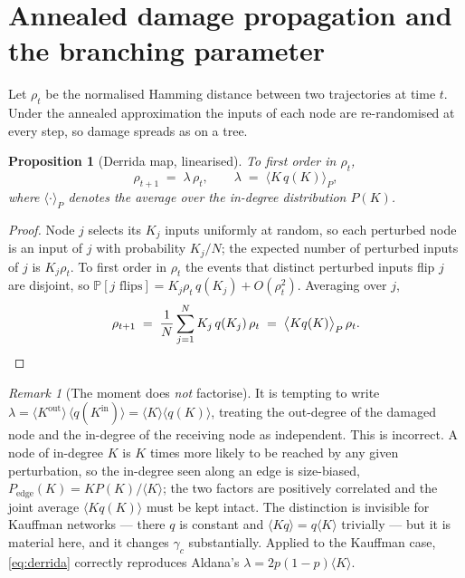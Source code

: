 \documentclass[11pt]{article}
\newtheorem{proposition}{Proposition}
\theoremstyle{remark}
\newtheorem{remark}{Remark}
\newcommand{\Prob}{\mathbb{P}}
\begin{document}
\section{Annealed damage propagation and the branching parameter}
\label{sec:derrida}

Let $\rho_t$ be the normalised Hamming distance between two trajectories at time
$t$. Under the annealed approximation the inputs of each node are re-randomised
at every step, so damage spreads as on a tree.

\begin{proposition}[Derrida map, linearised]
\label{prop:lambda}
To first order in $\rho_t$,
\begin{equation}
  \rho_{t+1} \;=\; \lambda\,\rho_t,
  \qquad
  \lambda \;=\; \big\langle K\,q(K)\big\rangle_{P},
  \label{eq:derrida}
\end{equation}
where $\langle\cdot\rangle_P$ denotes the average over the in-degree
distribution $P(K)$.
\end{proposition}

\begin{proof}
Node $j$ selects its $K_j$ inputs uniformly at random, so each perturbed node is
an input of $j$ with probability $K_j/N$; the expected number of perturbed
inputs of $j$ is $K_j\rho_t$. To first order in $\rho_t$ the events that
distinct perturbed inputs flip $j$ are disjoint, so
$\Prob[j\text{ flips}]=K_j\rho_t\,q(K_j)+O(\rho_t^2)$. Averaging over $j$,
\begin{equation}
  \rho_{t+1}
  \;=\; \frac1N\sum_{j=1}^{N} K_j\,q(K_j)\,\rho_t
  \;=\; \big\langle K q(K)\big\rangle_P\,\rho_t . \qedhere
\end{equation}
\end{proof}

\begin{remark}[The moment does \emph{not} factorise]
\label{rem:nofactor}
It is tempting to write $\lambda=\langle K^{\mathrm{out}}\rangle\,\langle
q(K^{\mathrm{in}})\rangle=\langle K\rangle\langle q(K)\rangle$, treating the
out-degree of the damaged node and the in-degree of the receiving node as
independent. This is incorrect. A node of in-degree $K$ is $K$ times more likely
to be reached by any given perturbation, so the in-degree seen along an edge is
size-biased, $P_{\mathrm{edge}}(K)=KP(K)/\langle K\rangle$; the two factors are
positively correlated and the joint average $\langle Kq(K)\rangle$ must be kept
intact. The distinction is invisible for Kauffman networks --- there $q$ is
constant and $\langle Kq\rangle=q\langle K\rangle$ trivially --- but it is
material here, and it changes $\gamma_c$ substantially. Applied to the Kauffman
case, \eqref{eq:derrida} correctly reproduces Aldana's
$\lambda=2p(1-p)\langle K\rangle$.
\end{remark}
\end{document}
